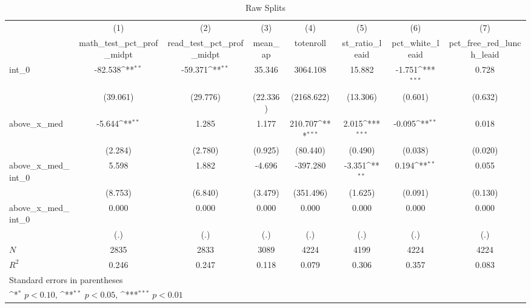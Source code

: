 \begin{table}[htbp]\centering
\def\sym#1{\ifmmode^{#1}\else\(^{#1}\)\fi}
\caption{Raw Splits}
\begin{tabular}{l*{7}{c}}
\hline\hline
            &\multicolumn{1}{c}{(1)}&\multicolumn{1}{c}{(2)}&\multicolumn{1}{c}{(3)}&\multicolumn{1}{c}{(4)}&\multicolumn{1}{c}{(5)}&\multicolumn{1}{c}{(6)}&\multicolumn{1}{c}{(7)}\\
            &\multicolumn{1}{c}{math\_test\_pct\_prof\_midpt}&\multicolumn{1}{c}{read\_test\_pct\_prof\_midpt}&\multicolumn{1}{c}{mean\_ap}&\multicolumn{1}{c}{totenroll}&\multicolumn{1}{c}{st\_ratio\_leaid}&\multicolumn{1}{c}{pct\_white\_leaid}&\multicolumn{1}{c}{pct\_free\_red\_lunch\_leaid}\\
\hline
int\_0       &     -82.538\sym{**} &     -59.371\sym{**} &      35.346         &    3064.108         &      15.882         &      -1.751\sym{***}&       0.728         \\
            &    (39.061)         &    (29.776)         &    (22.336)         &  (2168.622)         &    (13.306)         &     (0.601)         &     (0.632)         \\
[1em]
above\_x\_med &      -5.644\sym{**} &       1.285         &       1.177         &     210.707\sym{***}&       2.015\sym{***}&      -0.095\sym{**} &       0.018         \\
            &     (2.284)         &     (2.780)         &     (0.925)         &    (80.440)         &     (0.490)         &     (0.038)         &     (0.020)         \\
[1em]
above\_x\_med\_int\_0&       5.598         &       1.882         &      -4.696         &    -397.280         &      -3.351\sym{**} &       0.194\sym{**} &       0.055         \\
            &     (8.753)         &     (6.840)         &     (3.479)         &   (351.496)         &     (1.625)         &     (0.091)         &     (0.130)         \\
[1em]
above\_x\_med\_int\_0&       0.000         &       0.000         &       0.000         &       0.000         &       0.000         &       0.000         &       0.000         \\
            &         (.)         &         (.)         &         (.)         &         (.)         &         (.)         &         (.)         &         (.)         \\
\hline
\(N\)       &        2835         &        2833         &        3089         &        4224         &        4199         &        4224         &        4224         \\
\(R^{2}\)   &       0.246         &       0.247         &       0.118         &       0.079         &       0.306         &       0.357         &       0.083         \\
\hline\hline
\multicolumn{8}{l}{\footnotesize Standard errors in parentheses}\\
\multicolumn{8}{l}{\footnotesize \sym{*} \(p<0.10\), \sym{**} \(p<0.05\), \sym{***} \(p<0.01\)}\\
\end{tabular}
\end{table}
